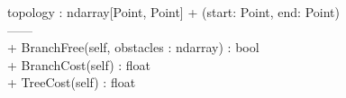 {
	topology : ndarray[Point, Point]
}
{
+ \dunder (start: Point, end: Point) \\

------\\

+ BranchFree(self, obstacles : ndarray) : bool \\
+ BranchCost(self) : float\\
+ TreeCost(self) : float
}